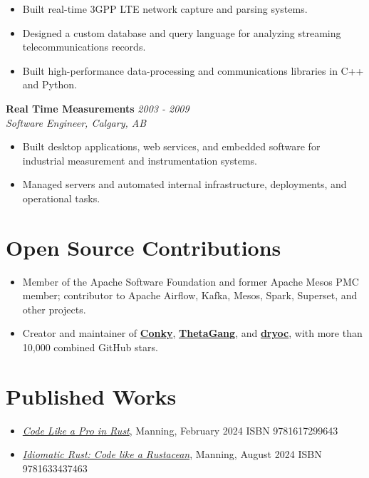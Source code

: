\documentclass[margin,line]{resume}
\newcommand{\company}[1]{\textbf{#1}}
\newcommand{\jobdates}[1]{\textit{#1}}
\newcommand{\jobtitle}[1]{\textit{#1}}
\begin{document}
\begin{resume}
\begin{itemize}
    \item Built real-time 3GPP LTE network capture and parsing systems.
    \item Designed a custom database and query language for analyzing streaming telecommunications records.
    \item Built high-performance data-processing and communications libraries in C++ and Python.
\end{itemize}

\filbreak
\company{Real Time Measurements} \hfill \jobdates{2003 - 2009}\\
\jobtitle{Software Engineer, Calgary, AB}

\begin{itemize}
    \item Built desktop applications, web services, and embedded software for industrial measurement and instrumentation systems.
    \item Managed servers and automated internal infrastructure, deployments, and operational tasks.
\end{itemize}

\vspace{8pt}

\section{Open Source Contributions}

\begin{itemize}[partopsep=0mm]
    \item Member of the Apache Software Foundation and former Apache Mesos PMC member; contributor to Apache Airflow, Kafka, Mesos, Spark, Superset, and other projects.
    \item Creator and maintainer of \href{https://github.com/brndnmtthws/conky/}{\textbf{Conky}}, \href{https://github.com/brndnmtthws/thetagang/}{\textbf{ThetaGang}}, and \href{https://github.com/brndnmtthws/dryoc/}{\textbf{dryoc}}, with more than 10,000 combined GitHub stars.
\end{itemize}

\vspace{8pt}

\section{Published Works}

\begin{itemize}[partopsep=0mm]
    \item \href{https://www.manning.com/books/code-like-a-pro-in-rust}{\textit{Code Like a Pro in Rust}}, Manning, February 2024 \hfill ISBN 9781617299643
    \item \href{https://www.manning.com/books/idiomatic-rust}{\textit{Idiomatic Rust: Code like a Rustacean}}, Manning, August 2024 \hfill ISBN 9781633437463
\end{itemize}


\end{resume}
\end{document}
